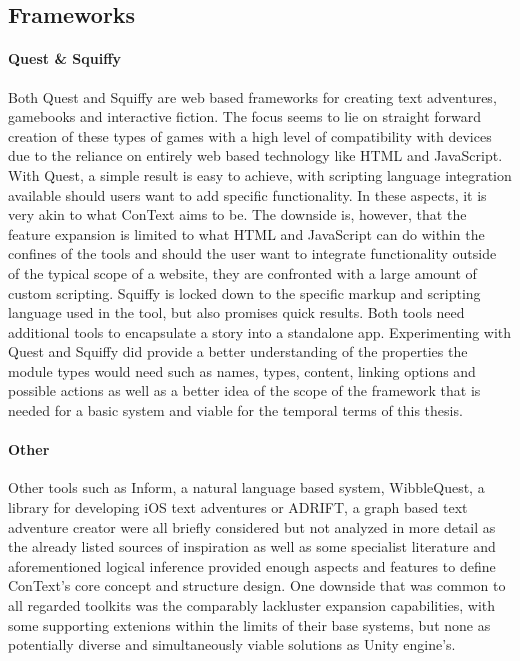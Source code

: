 \subsection{Frameworks}
\paragraph{Quest & Squiffy} %
Both Quest and Squiffy are web based frameworks for creating text adventures, gamebooks and interactive fiction. The focus seems to lie on straight forward creation of these types of games with a high level of compatibility with devices due to the reliance on entirely web based technology like HTML and JavaScript. With Quest, a simple result is easy to achieve, with scripting language integration available should users want to add specific functionality. In these aspects, it is very akin to what ConText aims to be. The downside is, however, that the feature expansion is limited to what HTML and JavaScript can do within the confines of the tools and should the user want to integrate functionality outside of the typical scope of a website, they are confronted with a large amount of custom scripting. 
Squiffy is locked down to the specific markup and scripting language used in the tool, but also promises quick results.
Both tools need additional tools to encapsulate a story into a standalone app. 
Experimenting with Quest and Squiffy did provide a better understanding of the properties the module types would need such as names, types, content, linking options and possible actions as well as a better idea of the scope of the framework that is needed for a basic system and viable for the temporal terms of this thesis.
\paragraph{Other}
Other tools such as Inform, a natural language based system, WibbleQuest, a library for developing iOS text adventures or ADRIFT, a graph based text adventure creator were all briefly considered but not analyzed in more detail as the already listed sources of inspiration as well as some specialist literature and aforementioned logical inference provided enough aspects and features to define ConText's core concept and structure design. 
One downside that was common to all regarded toolkits was the comparably lackluster expansion capabilities, with some supporting extenions within the limits of their base systems, but none as potentially diverse and simultaneously viable solutions as Unity engine's.

